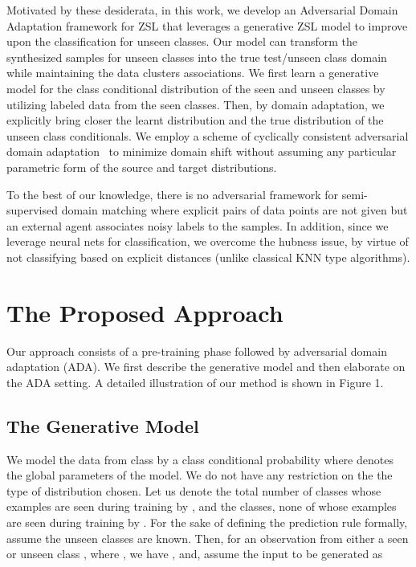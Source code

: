 \documentclass[10pt,twocolumn,letterpaper]{article}
\begin{document}
Motivated by these desiderata, in this work, we develop an Adversarial Domain Adaptation framework for ZSL that leverages a generative ZSL model to improve upon the classification for unseen classes. Our model can transform the synthesized samples for unseen classes into the true test/unseen class domain while maintaining the data clusters associations. We first learn a generative model for the class conditional distribution of the seen and unseen classes by utilizing labeled data from the seen classes. Then, by domain adaptation, we explicitly bring closer the learnt distribution and the true distribution of the unseen class conditionals. We employ a scheme of cyclically consistent adversarial domain adaptation~\cite{cycada} to minimize domain shift without assuming any particular parametric form of the source and target distributions.

To the best of our knowledge, there is no adversarial framework for semi-supervised domain matching where explicit pairs of data points are not given but an external agent associates noisy labels to the samples. In addition, since we leverage neural nets for classification, we overcome the hubness issue, by virtue of not classifying based on explicit distances (unlike classical KNN type algorithms).

\section{The Proposed Approach}
\label{sec:model}

Our approach consists of a pre-training phase followed by adversarial domain adaptation (ADA). We first describe the generative model and then elaborate on the ADA setting. A detailed illustration of our method is shown in Figure 1.

\subsection{The Generative Model}
We model the data from class  by a class conditional probability  where  denotes the global parameters of the model. We do not have any restriction on the the type of distribution chosen. Let us denote the total number of classes whose examples are seen during training by , and the classes, none of whose examples are seen during training by . For the sake of defining the prediction rule formally, assume the unseen classes are known. Then, for an observation  from either a seen or unseen class , where , we have , and, assume the input to be generated as 
 
\end{document}
